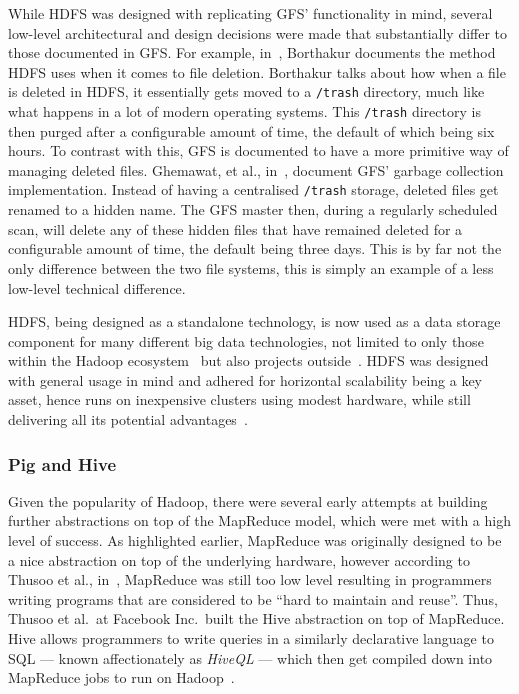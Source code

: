 While HDFS was designed with replicating GFS' functionality in mind, several low-level architectural and design decisions
were made that substantially differ to those documented in GFS. For example, in~\cite{borthakur2007hadoop}, Borthakur
documents the method HDFS uses when it comes to file deletion. Borthakur talks about how when a file is deleted in HDFS,
it essentially gets moved to a \texttt{/trash} directory, much like what happens in a lot of modern operating systems.
This \texttt{/trash} directory is then purged after a configurable amount of time, the default of which being six hours.
To contrast with this, GFS is documented to have a more primitive way of managing deleted files. Ghemawat, et al.,
in~\cite{ghemawat_google_2003}, document GFS' garbage collection implementation. Instead of having a centralised
\texttt{/trash} storage, deleted files get renamed to a hidden name. The GFS master then, during a regularly scheduled
scan, will delete any of these hidden files that have remained deleted for a configurable amount of time, the default
being three days. This is by far not the only difference between the two file systems, this is simply an example of a
less low-level technical difference.

HDFS, being designed as a standalone technology, is now used as a data storage component for many different big data
technologies, not limited to only those within the Hadoop ecosystem~\cite{taylor2010overview} but also projects
outside~\cite{xin2013graphx,yang2013big}. HDFS was designed with general usage in mind and adhered for horizontal
scalability being a key asset, hence runs on inexpensive clusters using modest hardware, while still delivering all
its potential advantages~\cite{borthakur2008hdfs}.



\subsubsection{Pig and Hive} %
\label{ssub:pig_and_hive}

Given the popularity of Hadoop, there were several early attempts at building further abstractions on top of the
MapReduce model, which were met with a high level of success. As highlighted earlier, MapReduce was originally designed
to be a nice abstraction on top of the underlying hardware, however according to Thusoo et al., in~\cite{thusoo2009hive},
MapReduce was still too low level resulting in programmers writing programs that are considered to be ``hard to maintain
and reuse''. Thus, Thusoo et al.\ at Facebook Inc.\ built the Hive abstraction on top of MapReduce. Hive allows
programmers to write queries in a similarly declarative language to SQL --- known affectionately as \emph{HiveQL} ---
which then get compiled down into MapReduce jobs to run on Hadoop~\cite{thusoo2010hive}.

